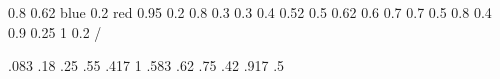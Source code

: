 \documentclass[12pt,ngerman]{scrartcl}
\begin{document}
\blindtext
\begin{sparkline}{10}
 0.8
 0.62 blue
 0.2 red
 0.95 0.2 0.8 0.3 0.3 0.4 0.52 0.5 0.62
0.6 0.7 0.7 0.5 0.8 0.4 0.9 0.25 1 0.2 /
\end{sparkline}
\blindtext

\begin{sparkline}{5}
\sparkspike .083 .18
\sparkspike .25 .55
\sparkspike .417 1
\sparkspike .583 .62
\sparkspike .75 .42
\sparkspike .917 .5
\end{sparkline}
\end{document}
